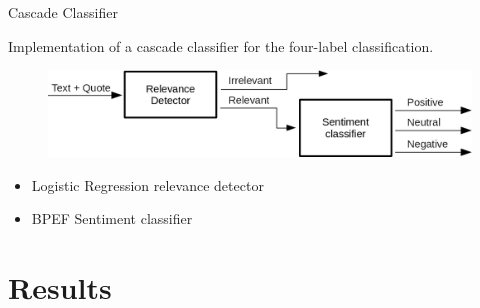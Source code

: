 \documentclass{beamer}
\begin{document}
	\begin{frame}{Cascade Classifier}
		
		Implementation of a cascade classifier for the four-label classification.
		
		\begin{figure}
				\centering
				\includegraphics[width=\linewidth]{figures/blocks_cascade.png}
		\end{figure}
	
		\begin{itemize}
			\item Logistic Regression relevance detector
			\item BPEF Sentiment classifier
		\end{itemize}
		
		
	\end{frame}



	\section{Results}
	
\end{document}
